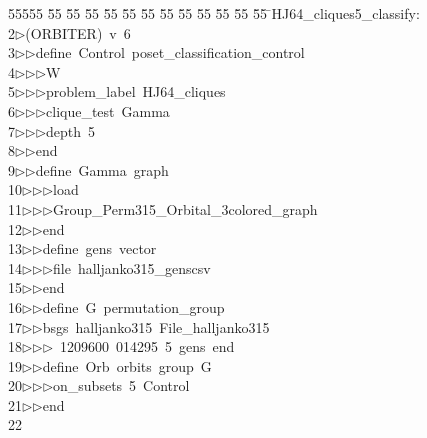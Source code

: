 %
%
\begin{tabbing}
55555 \= 55 \= 55 \= 55 \= 55 \= 55 \= 55 \= 55 \= 55 \= 55 \= 55 \= 55 \= 55 \= \>HJ64\_cliques5\_classify:\\[0pt]
2\>$\triangleright$\>(ORBITER)\ v\ 6\ \\[0pt]
3\>$\triangleright$\>$\triangleright$\>define\ Control\ poset\_classification\_control\ \\[0pt]
4\>$\triangleright$\>$\triangleright$\>$\triangleright$\>W\ \\[0pt]
5\>$\triangleright$\>$\triangleright$\>$\triangleright$\>problem\_label\ HJ64\_cliques\ \\[0pt]
6\>$\triangleright$\>$\triangleright$\>$\triangleright$\>clique\_test\ Gamma\ \\[0pt]
7\>$\triangleright$\>$\triangleright$\>$\triangleright$\>depth\ 5\ \\[0pt]
8\>$\triangleright$\>$\triangleright$\>end\ \\[0pt]
9\>$\triangleright$\>$\triangleright$\>define\ Gamma\ graph\ \\[0pt]
10\>$\triangleright$\>$\triangleright$\>$\triangleright$\>load\ \\[0pt]
11\>$\triangleright$\>$\triangleright$\>$\triangleright$\>Group\_Perm315\_Orbital\_3colored\_graph\ \\[0pt]
12\>$\triangleright$\>$\triangleright$\>end\ \\[0pt]
13\>$\triangleright$\>$\triangleright$\>define\ gens\ vector\ \\[0pt]
14\>$\triangleright$\>$\triangleright$\>$\triangleright$\>file\ halljanko315\_genscsv\ \\[0pt]
15\>$\triangleright$\>$\triangleright$\>end\ \\[0pt]
16\>$\triangleright$\>$\triangleright$\>define\ G\ permutation\_group\ \\[0pt]
17\>$\triangleright$\>$\triangleright$\>bsgs\ halljanko315\ File\_halljanko315\ \\[0pt]
18\>$\triangleright$\>$\triangleright$\>$\triangleright$\ 1209600\ 014295\ 5\ gens\ end\ \\[0pt]
19\>$\triangleright$\>$\triangleright$\>define\ Orb\ orbits\ group\ G\ \\[0pt]
20\>$\triangleright$\>$\triangleright$\>$\triangleright$\>on\_subsets\ 5\ Control\ \\[0pt]
21\>$\triangleright$\>$\triangleright$\>end\\[0pt]
22\>\end{tabbing}
